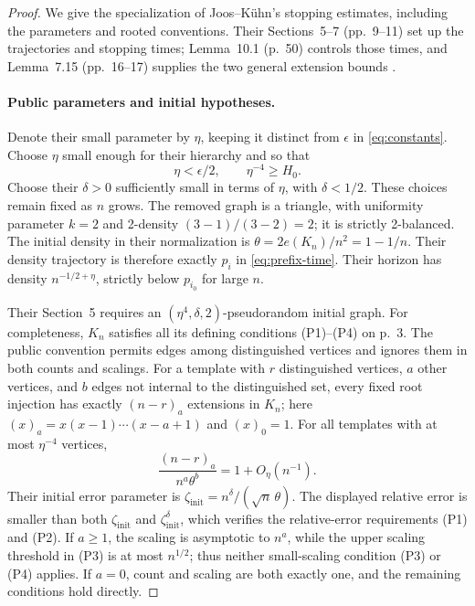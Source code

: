 \begin{proof}
We give the specialization of Joos--K\"uhn's stopping estimates, including
the parameters and rooted conventions. Their Sections~5--7 (pp.~9--11)
set up the trajectories and stopping times; Lemma~10.1 (p.~50) controls
those times, and Lemma~7.15 (pp.~16--17) supplies the two general extension bounds
\cite{joosKuehn2025}.

\paragraph{Public parameters and initial hypotheses.}
Denote their small parameter by $\eta$, keeping it distinct from
$\epsilon$ in \eqref{eq:constants}. Choose $\eta$ small enough for their
hierarchy and so that
\[
 \eta<\epsilon/2,\qquad \eta^{-4}\ge H_0.
\]
Choose their $\delta>0$ sufficiently small in terms of $\eta$, with
$\delta<1/2$. These choices remain fixed as $n$ grows.
The removed graph is a triangle, with uniformity parameter $k=2$ and
2-density $(3-1)/(3-2)=2$; it is strictly 2-balanced.
The initial density in their normalization is
$\theta=2e(K_n)/n^2=1-1/n$. Their density trajectory is therefore exactly
$p_i$ in \eqref{eq:prefix-time}. Their horizon has density
$n^{-1/2+\eta}$, strictly below $p_{i_0}$ for large $n$.

Their Section~5 requires an $(\eta^4,\delta,2)$-pseudorandom initial
graph. For completeness, $K_n$ satisfies all its defining conditions
(P1)--(P4) on p.~3. The public convention permits edges among
distinguished vertices and ignores them in both counts and scalings.
For a template with $r$ distinguished vertices, $a$ other vertices, and
$b$ edges not internal to the distinguished set, every fixed root
injection has exactly $(n-r)_a$ extensions in $K_n$; here
$(x)_a=x(x-1)\cdots(x-a+1)$ and $(x)_0=1$.
For all templates with at most $\eta^{-4}$ vertices,
\[
 \frac{(n-r)_a}{n^a\theta^b}=1+O_\eta(n^{-1}).
\]
Their initial error parameter is
$\zeta_{\mathrm{init}}=n^\delta/(\sqrt n\,\theta)$.
The displayed relative error is smaller than both
$\zeta_{\mathrm{init}}$ and $\zeta_{\mathrm{init}}^\delta$, which verifies
the relative-error requirements (P1) and (P2).
If $a\ge1$, the scaling is asymptotic to $n^a$, while the upper scaling
threshold in (P3) is at most $n^{1/2}$; thus neither small-scaling condition
(P3) or (P4) applies. If $a=0$, count and scaling are both exactly one,
and the remaining conditions hold directly.


\end{proof}
